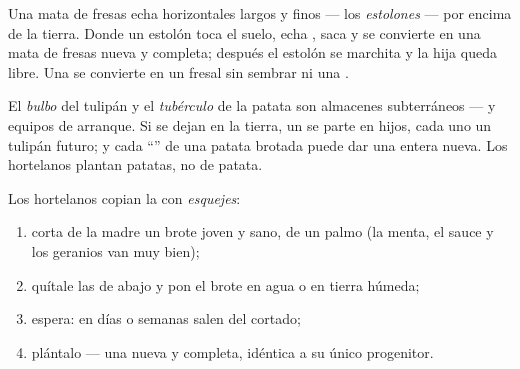 \begin{example}\label{ex:g4:plants-without-seeds:runner}
Una mata de fresas echa  horizontales largos y finos --- los
\emph{estolones} --- por encima de la tierra. Donde un
estolón toca el suelo, echa , saca  y se convierte en una
mata de fresas nueva y completa; después el estolón se marchita y la
hija queda libre. Una  se convierte en un fresal sin sembrar ni
una .
\end{example}

\begin{example}\label{ex:g4:plants-without-seeds:bulbtuber}
El \emph{bulbo} del tulipán y el
\emph{tubérculo} de la patata son almacenes
subterráneos --- y equipos de arranque. Si se dejan en la tierra, un
 se parte en  hijos, cada uno un tulipán futuro; y cada
``'' de una patata brotada puede dar una  entera nueva. Los
hortelanos plantan patatas, no  de patata.
\end{example}

\begin{method}\label{met:g4:plants-without-seeds:cutting}
Los hortelanos copian la  con
\emph{esquejes}:
\begin{enumerate}
  \item corta de la  madre un brote joven y sano, de un palmo
        (la menta, el sauce y los geranios van muy bien);
  \item quítale las  de abajo y pon el brote en agua o en tierra
        húmeda;
  \item espera: en días o semanas salen  del  cortado;
  \item plántalo --- una  nueva y completa, idéntica a su único
        progenitor.
\end{enumerate}
\end{method}

